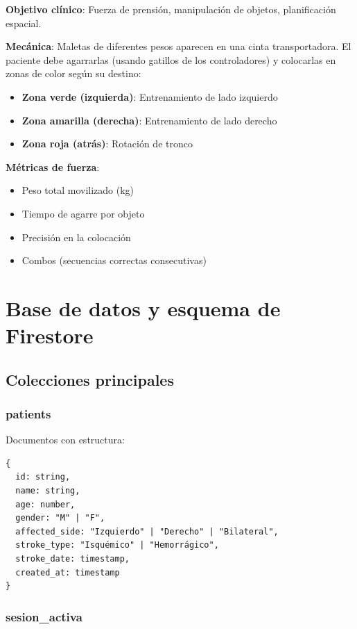\textbf{Objetivo clínico}: Fuerza de prensión, manipulación de objetos, planificación espacial.

\textbf{Mecánica}: Maletas de diferentes pesos aparecen en una cinta transportadora. El paciente debe agarrarlas (usando gatillos de los controladores) y colocarlas en zonas de color según su destino:
\begin{itemize}
    \item \textbf{Zona verde (izquierda)}: Entrenamiento de lado izquierdo
    \item \textbf{Zona amarilla (derecha)}: Entrenamiento de lado derecho
    \item \textbf{Zona roja (atrás)}: Rotación de tronco
\end{itemize}

\textbf{Métricas de fuerza}:
\begin{itemize}
    \item Peso total movilizado (kg)
    \item Tiempo de agarre por objeto
    \item Precisión en la colocación
    \item Combos (secuencias correctas consecutivas)
\end{itemize}

\section{Base de datos y esquema de Firestore}

\subsection{Colecciones principales}

\subsubsection{patients}

Documentos con estructura:
\begin{verbatim}
{
  id: string,
  name: string,
  age: number,
  gender: "M" | "F",
  affected_side: "Izquierdo" | "Derecho" | "Bilateral",
  stroke_type: "Isquémico" | "Hemorrágico",
  stroke_date: timestamp,
  created_at: timestamp
}
\end{verbatim}

\subsubsection{sesion\_activa}

